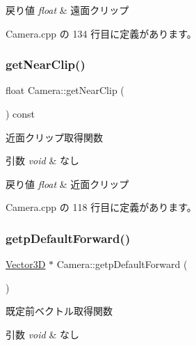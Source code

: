 \begin{DoxyRetVals}{戻り値}
{\em float} & 遠面クリップ \\
\hline
\end{DoxyRetVals}


 Camera.\+cpp の 134 行目に定義があります。

\mbox{\label{class_camera_a85236e6f5584c5123251664ff7b848d9}} 
\subsubsection{\texorpdfstring{get\+Near\+Clip()}{getNearClip()}}
{\footnotesize\ttfamily float Camera\+::get\+Near\+Clip (\begin{DoxyParamCaption}{ }\end{DoxyParamCaption}) const}



近面クリップ取得関数 


\begin{DoxyParams}{引数}
{\em void} & なし \\
\hline
\end{DoxyParams}

\begin{DoxyRetVals}{戻り値}
{\em float} & 近面クリップ \\
\hline
\end{DoxyRetVals}


 Camera.\+cpp の 118 行目に定義があります。

\mbox{\label{class_camera_a6f4c660007278a3db020a72242c9cb26}} 
\subsubsection{\texorpdfstring{getp\+Default\+Forward()}{getpDefaultForward()}}
{\footnotesize\ttfamily \mbox{\hyperlink{class_vector3_d}{Vector3D}} $\ast$ Camera\+::getp\+Default\+Forward (\begin{DoxyParamCaption}{ }\end{DoxyParamCaption})}



既定前ベクトル取得関数 


\begin{DoxyParams}{引数}
{\em void} & なし \\
\hline
\end{DoxyParams}

